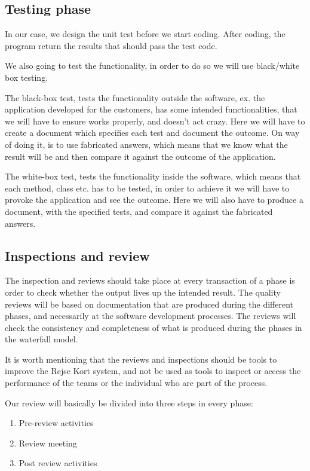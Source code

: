 \subsection*{Testing phase}

In our case, we design the unit test before we start coding. After coding, the program return the results that should pass the test code. 

We also going to test the functionality, in order to do so we will use black/white box testing.

The black-box test, tests the functionality outside the software, ex. the application developed for the customers, has some intended functionalities, that we will have to ensure works properly, and doesn’t act crazy. Here we will have to create a document which specifies each test and document the outcome. On way of doing it, is to use fabricated answers, which means that we know what the result will be and then compare it against the outcome of the application.


The white-box test, tests the functionality inside the software, which means that each method, class etc. has to be tested, in order to achieve it we will have to provoke the application and see the outcome. Here we will also have to produce a document, with the specified tests, and compare it against the fabricated answers.


\subsection*{Inspections and review} 


The inspection and reviews should take place at every transaction of a phase is order to check whether the output lives up the intended result. The quality reviews will be based on documentation that are produced during the different phases, and necessarily at the software development processes. The reviews will check the consistency and completeness of what is produced during the phases in the waterfall model.


It is worth mentioning that the reviews and inspections should be tools to improve the Rejse Kort system, and not be used as tools to inspect or access the performance of the teams or the individual who are part of the process.


Our review will basically be divided into three steps in every phase:
\begin{enumerate}
	\item Pre-review activities
	\item Review meeting
	\item Post review activities
\end{enumerate}


